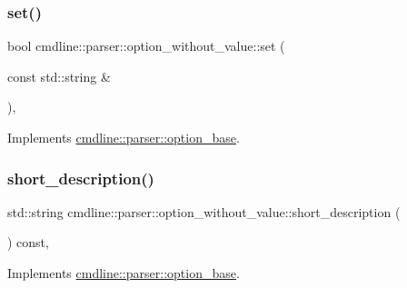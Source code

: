 \subsubsection{\texorpdfstring{set()}{set()}\hspace{0.1cm}{\footnotesize\ttfamily [2/2]}}
{\footnotesize\ttfamily bool cmdline\+::parser\+::option\+\_\+without\+\_\+value\+::set (\begin{DoxyParamCaption}\item[{const std\+::string \&}]{ }\end{DoxyParamCaption})\hspace{0.3cm}{\ttfamily [inline]}, {\ttfamily [virtual]}}



Implements \mbox{\hyperlink{classcmdline_1_1parser_1_1option__base_a60444de6a257a3cca44a7a687a1d16fd}{cmdline\+::parser\+::option\+\_\+base}}.

\mbox{\label{classcmdline_1_1parser_1_1option__without__value_a094839df784a0f6a5044ec42d682f845}} 
\subsubsection{\texorpdfstring{short\_description()}{short\_description()}}
{\footnotesize\ttfamily std\+::string cmdline\+::parser\+::option\+\_\+without\+\_\+value\+::short\+\_\+description (\begin{DoxyParamCaption}{ }\end{DoxyParamCaption}) const\hspace{0.3cm}{\ttfamily [inline]}, {\ttfamily [virtual]}}



Implements \mbox{\hyperlink{classcmdline_1_1parser_1_1option__base_a091cab2d9f8e85a8e5e1a1a11e274aff}{cmdline\+::parser\+::option\+\_\+base}}.

\mbox{\label{classcmdline_1_1parser_1_1option__without__value_a6a4f9070fc44c46584515ad0a72a75af}} 
